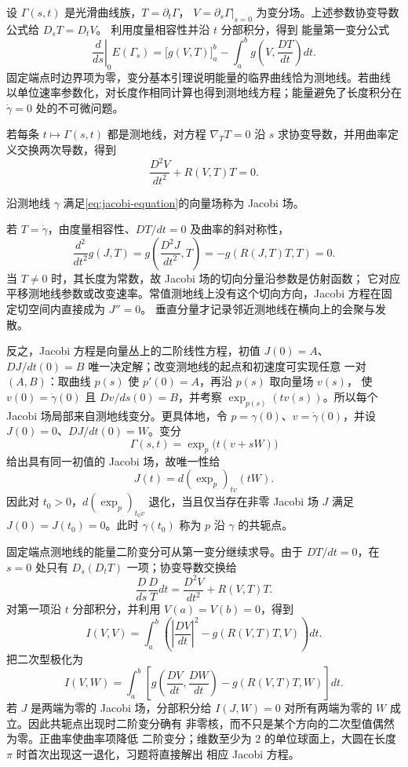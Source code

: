 设 $\Gamma(s,t)$ 是光滑曲线族，$T=\partial_t\Gamma$，
$V=\partial_s\Gamma|_{s=0}$ 为变分场。上述参数协变导数公式给 $D_sT=D_tV$。
利用度量相容性并沿 $t$ 分部积分，得到
能量第一变分公式
\begin{equation}\label{eq:riemannian-energy-first-variation}
 \left.\frac d{ds}\right|_{0}E(\Gamma_s)
 =\bigl[g(V,T)\bigr]_a^b-
 \int_a^bg\!\left(V,\frac{DT}{dt}\right)dt.
\end{equation}
固定端点时边界项为零，变分基本引理说明能量的临界曲线恰为测地线。若曲线
以单位速率参数化，对长度作相同计算也得到测地线方程；能量避免了长度积分在
$\dot\gamma=0$ 处的不可微问题。

若每条 $t\mapsto\Gamma(s,t)$ 都是测地线，对方程
$\nabla_TT=0$ 沿 $s$ 求协变导数，并用曲率定义交换两次导数，得到
\begin{equation}\label{eq:jacobi-equation}
 \frac{D^2V}{dt^2}+R(V,T)T=0.
\end{equation}

\begin{definition}
沿测地线 $\gamma$ 满足\eqref{eq:jacobi-equation}的向量场称为 Jacobi 场。
\end{definition}

若 $T=\dot\gamma$，由度量相容性、$DT/dt=0$ 及曲率的斜对称性，
\[
 \frac{d^2}{dt^2}g(J,T)
 =g\!\left(\frac{D^2J}{dt^2},T\right)
 =-g(R(J,T)T,T)=0.
\]
当 $T\ne0$ 时，其长度为常数，故 Jacobi 场的切向分量沿参数是仿射函数；
它对应平移测地线参数或改变速率。常值测地线上没有这个切向方向，Jacobi
方程在固定切空间内直接成为 $J''=0$。
垂直分量才记录邻近测地线在横向上的会聚与发散。

反之，Jacobi 方程是向量丛上的二阶线性方程，初值
$J(0)=A$、$DJ/dt(0)=B$ 唯一决定解；改变测地线的起点和初速度可实现任意
一对 $(A,B)$：取曲线 $p(s)$ 使 $p'(0)=A$，再沿 $p(s)$ 取向量场 $v(s)$，
使 $v(0)=\dot\gamma(0)$ 且 $Dv/ds(0)=B$，并考察
$\exp_{p(s)}(tv(s))$。所以每个 Jacobi 场局部来自测地线变分。更具体地，令
$p=\gamma(0)$、$v=\dot\gamma(0)$，并设 $J(0)=0$、$DJ/dt(0)=W$。变分
\[
 \Gamma(s,t)=\exp_p\bigl(t(v+sW)\bigr)
\]
给出具有同一初值的 Jacobi 场，故唯一性给
\begin{equation}\label{eq:jacobi-exponential-differential}
 J(t)=d(\exp_p)_{tv}(tW).
\end{equation}
因此对 $t_0>0$，$d(\exp_p)_{t_0v}$ 退化，当且仅当存在非零 Jacobi 场
$J$ 满足 $J(0)=J(t_0)=0$。此时 $\gamma(t_0)$ 称为 $p$ 沿 $\gamma$ 的共轭点。

固定端点测地线的能量二阶变分可从第一变分继续求导。由于
$DT/dt=0$，在 $s=0$ 处只有 $D_s(D_tT)$ 一项；协变导数交换给
\[
 \frac D{ds}\frac DT{dt}
 =\frac{D^2V}{dt^2}+R(V,T)T.
\]
对第一项沿 $t$ 分部积分，并利用 $V(a)=V(b)=0$，得到
\begin{equation}\label{eq:riemannian-energy-second-variation}
 I(V,V)=\int_a^b
 \left(\left|\frac{DV}{dt}\right|^2-g(R(V,T)T,V)\right)dt.
\end{equation}
把二次型极化为
\[
 I(V,W)=\int_a^b\left[g\!\left(\frac{DV}{dt},\frac{DW}{dt}\right)
 -g(R(V,T)T,W)\right]dt.
\]
若 $J$ 是两端为零的 Jacobi 场，分部积分给
$I(J,W)=0$ 对所有两端为零的 $W$ 成立。因此共轭点出现时二阶变分确有
非零核，而不只是某个方向的二次型值偶然为零。正曲率使曲率项降低
二阶变分；维数至少为 $2$ 的单位球面上，大圆在长度 $\pi$ 时首次出现这一退化，习题将直接解出
相应 Jacobi 方程。


